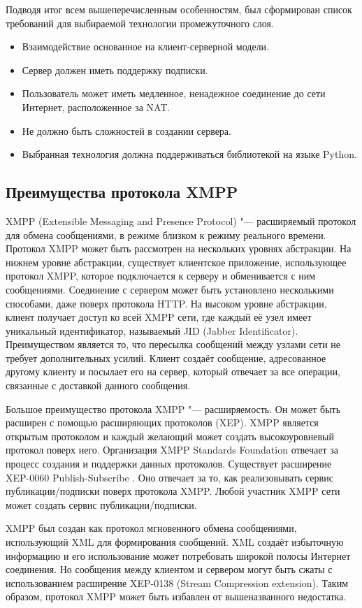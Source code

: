 Подводя итог всем вышеперечисленным особенностям, был сформирован список
требований для выбираемой технологии промежуточного слоя.
\begin{itemize}
\item Взаимодействие основанное на клиент-серверной модели.
\item Сервер должен иметь поддержку подписки.
\item Пользователь может иметь медленное, ненадежное соединение до
сети Интернет, расположенное за NAT.
\item Не должно быть сложностей в создании сервера.
\item Выбранная технология должна поддерживаться библиотекой на языке
Python.
\end{itemize}

\subsection{Преимущества протокола XMPP}
XMPP (Extensible Messaging and Presence Protocol) "--- расширяемый протокол для
обмена сообщениями, в режиме близком к режиму реального времени. Протокол XMPP
может быть рассмотрен на нескольких уровнях абстракции. На нижнем уровне
абстракции, существует клиентское приложение, использующее протокол XMPP,
которое подключается к серверу и обменивается с ним сообщениями. Соединение с
сервером может быть установлено несколькими способами, даже поверх протокола
HTTP. На высоком уровне абстракции, клиент получает доступ ко всей XMPP сети,
где каждый её узел имеет уникальный идентификатор, называемый JID (Jabber
Identificator). Преимуществом является то, что пересылка сообщений между узлами
сети не требует дополнительных усилий. Клиент создаёт сообщение, адресованное
другому клиенту и посылает его на сервер, который отвечает за все операции,
связанные с доставкой данного сообщения.

Большое преимущество протокола XMPP "--- расширяемость. Он может быть расширен с
помощью расширяющих протоколов (XEP). XMPP является открытым протоколом и каждый
желающий может создать высокоуровневый протокол поверх него. Организация XMPP
Standards Foundation отвечает за процесс создания и поддержки данных протоколов.
Существует расширение XEP-0060 Publish-Subscribe \cite{xep-0060}. Оно отвечает
за то, как реализовывать сервис публикации/подписки поверх протокола XMPP. Любой
участник XMPP сети может создать сервис публикации/подписки.

XMPP был создан как протокол мгновенного обмена сообщениями, использующий XML
для формирования сообщений. XML создаёт избыточную информацию и его
использование может потребовать широкой полосы Интернет соединения. Но сообщения
между клиентом и сервером могут быть сжаты с использованием расширение XEP-0138
(Stream Compression extension). Таким образом, протокол XMPP может быть избавлен
от вышеназванного недостатка.

